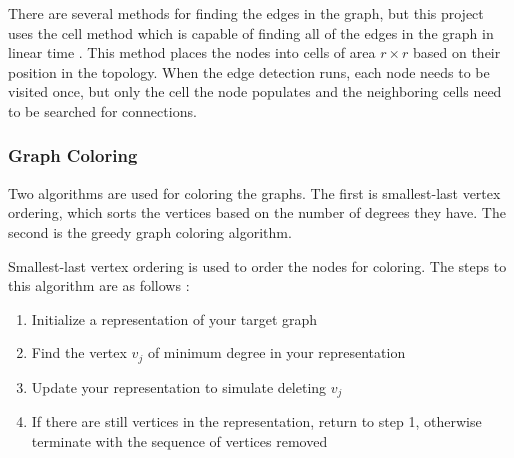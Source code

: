 \documentclass{article}
\begin{document}
        There are several methods for finding the edges in the graph, but this project uses the cell method which is capable of finding all of the edges in the graph in linear time \cite{rggpartition}. This method places the nodes into cells of area $r \times r$ based on their position in the topology. When the edge detection runs, each node needs to be visited once, but only the cell the node populates and the neighboring cells need to be searched for connections.

        \subsubsection{Graph Coloring}
        Two algorithms are used for coloring the graphs. The first is smallest-last vertex ordering, which sorts the vertices based on the number of degrees they have. The second is the greedy graph coloring algorithm.
        \par
        Smallest-last vertex ordering is used to order the nodes for coloring. The steps to this algorithm are as follows \cite{slv}:

        \begin{enumerate}
            \item Initialize a representation of your target graph
            \item Find the vertex $v_j$ of minimum degree in your representation
            \item Update your representation to simulate deleting $v_j$
            \item If there are still vertices in the representation, return to step 1, otherwise terminate with the sequence of vertices removed
        \end{enumerate}
\end{document}
